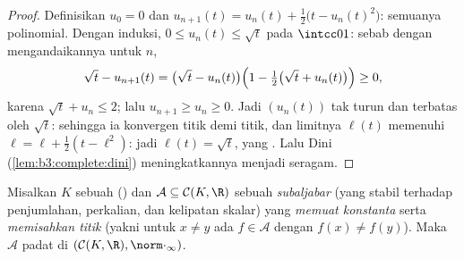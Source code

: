 \begin{proof}
Definisikan $u_0 = 0$ dan $u_{n+1}(t) = u_n(t) + \frac12\bigl(t -
u_n(t)^2\bigr)$: semuanya polinomial. Dengan induksi, $0 \leq u_n(t) \leq
\sqrt t$ pada $\intcc01$: sebab dengan mengandaikannya untuk $n$,
\[
\sqrt t - u_{n+1}(t) = \bigl(\sqrt t - u_n(t)\bigr)
\Bigl(1 - \tfrac12\bigl(\sqrt t + u_n(t)\bigr)\Bigr) \geq 0,
\]
karena $\sqrt t + u_n \leq 2$; lalu $u_{n+1} \geq u_n \geq 0$.
Jadi $(u_n(t))$ tak turun dan terbatas oleh $\sqrt t$: sehingga ia
konvergen titik demi titik, dan limitnya $\ell(t)$ memenuhi $\ell =
\ell + \frac12(t - \ell^2)$: jadi $\ell(t) = \sqrt t$, yang .
Lalu Dini (\cref{lem:b3:complete:dini}) meningkatkannya menjadi seragam.
\end{proof}

\begin{theorem}
\label{thm:b3:complete:stoneweierstrass}
Misalkan $K$ sebuah  () dan $\mathcal A \subseteq
\mathcal C(K, \R)$ sebuah \emph{subaljabar} (yang stabil terhadap penjumlahan,
perkalian, dan kelipatan skalar) yang \emph{memuat konstanta}
serta \emph{memisahkan titik} (yakni untuk $x \neq y$ ada $f \in
\mathcal A$ dengan $f(x) \neq f(y)$). Maka $\mathcal A$ padat di
$(\mathcal C(K,\R), \norm\cdot_\infty)$.
\end{theorem}

